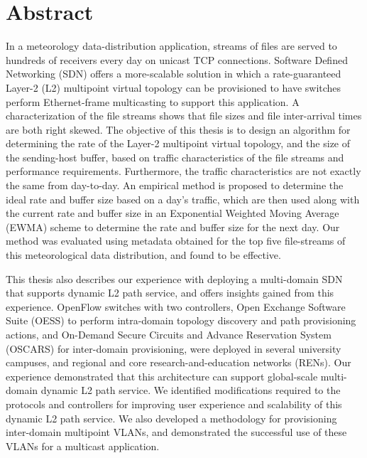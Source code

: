 \chapter*{Abstract} 
In a meteorology data-distribution application, streams of files are served to hundreds of receivers every day on unicast TCP connections. Software Defined Networking (SDN) offers a more-scalable solution in which 
a rate-guaranteed Layer-2 (L2) multipoint virtual topology can be provisioned to have switches perform Ethernet-frame
multicasting to support this application. A characterization
of the file streams shows that file sizes and
file inter-arrival times are both right skewed.
The objective of this thesis is to design an algorithm for determining
the rate of the Layer-2 multipoint virtual topology, and the size
of the sending-host buffer, based on
traffic characteristics of the file streams and performance requirements.
Furthermore, the traffic characteristics are not exactly the same
from day-to-day. An empirical method is proposed to determine the ideal rate and buffer size based on a day's traffic, which are then used along with the current rate and buffer
size in an Exponential Weighted Moving Average (EWMA) scheme to determine the rate and buffer size for the next day. Our method was
evaluated using metadata obtained for the top five file-streams of this meteorological data distribution, and found to be effective.

This thesis also describes our experience with deploying a multi-domain SDN that supports dynamic L2 path service, and offers insights gained from this experience. OpenFlow switches with two controllers, Open Exchange Software Suite (OESS) to perform intra-domain topology discovery and path provisioning actions, and On-Demand Secure Circuits and Advance Reservation System (OSCARS) for inter-domain provisioning, were deployed in several university campuses, and regional and core research-and-education networks (RENs). Our experience demonstrated that this architecture can support global-scale multi-domain dynamic L2 path service.  We identified modifications required to the protocols and controllers for improving user experience and scalability of this dynamic L2 path service. We also developed a methodology for provisioning inter-domain multipoint VLANs, and demonstrated the successful use of these VLANs for a multicast application.


